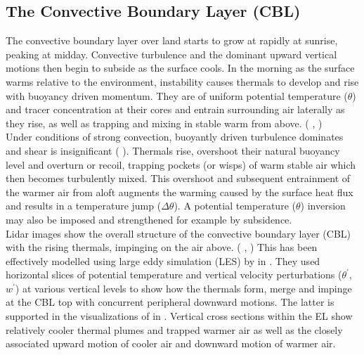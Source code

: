 \subsection{The Convective Boundary Layer (CBL)}

The convective boundary layer over land starts to grow at rapidly at sunrise, peaking at midday.  Convective turbulence and the dominant upward vertical motions then begin to subside as the surface cools. In the morning as the surface warms relative to the environment, instability causes thermals to develop and rise with buoyancy driven momentum. They are of uniform potential temperature ($\theta$) and tracer 
concentration at their cores and entrain surrounding air laterally as they rise, as well as trapping and mixing in stable warm from above. 
(\citeauthor{Stull-BLMetIntro} \cite{Stull-BLMetIntro}, \citeauthor{CrumStullEl} \cite{CrumStullEl})\\

Under conditions of strong convection, 
buoyantly driven turbulence dominates and shear is insignificant (\citeauthor{DirLEddy} \cite{DirLEddy}). Thermals rise, overshoot their
natural buoyancy level and overturn or recoil, trapping pockets (or wisps) of warm stable air which then becomes turbulently mixed.  This
overshoot and subsequent entrainment of the warmer air from aloft augments the warming caused by the surface heat flux and results in a
temperature jump ($\Delta \theta$).  A potential temperature ($\theta$) inversion may also be imposed and strengthened for example by subsidence.\\  

Lidar images show the overall structure of the convective boundary layer (\acs{CBL}) with the rising thermals, impinging on the air above.
(\citeauthor{CrumStullEl} \cite{CrumStullEl}, \citeauthor{Traum11} \cite{Traum11}) This has been effectively modelled using large eddy simulation (\acs{LES})
by \citeauthor{SchmidtSchu} in \cite{SchmidtSchu}.  They used horizontal slices of potential temperature and vertical velocity perturbations
($\theta^{'}$, $w^{'}$) at various vertical levels to show how the thermals form, merge and impinge at the \acs{CBL} top with concurrent peripheral downward motions.  The latter is supported in the visualizations of \citeauthor{SullMoengStev} in \cite{SullMoengStev}.  Vertical cross sections within the \acs{EL} show relatively cooler thermal plumes and trapped warmer air as well as the closely associated upward motion of cooler air and downward motion of warmer air.\\ 

